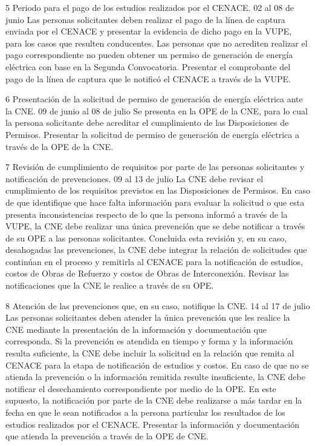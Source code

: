  5
 Periodo para el pago de los estudios realizados por el CENACE.
 02 al 08 de junio
 Las personas solicitantes deben realizar el pago de la línea de captura enviada por el CENACE y presentar la evidencia de dicho pago en la VUPE, para los casos que resulten conducentes. Las personas que no acrediten realizar el pago correspondiente no pueden obtener un permiso de generación de energía eléctrica con base en la Segunda Convocatoria.
 Presentar el comprobante del pago de la línea de captura que le notificó el CENACE a través de la VUPE.
 
 6
 Presentación de la solicitud de permiso de generación de energía eléctrica ante la CNE.
 09 de junio al 08 de julio
 Se presenta en la OPE de la CNE, para lo cual la persona solicitante debe acreditar el cumplimiento de las Disposiciones de Permisos.
 Presentar la solicitud de permiso de generación de energía eléctrica a través de la OPE de la CNE.
 
 7
 Revisión de cumplimiento de requisitos por parte de las personas solicitantes y notificación de prevenciones.
 09 al 13 de julio
 La CNE debe revisar el cumplimiento de los requisitos previstos en las Disposiciones de Permisos. En caso de que identifique que hace falta información para evaluar la solicitud o que esta presenta inconsistencias respecto de lo que la persona informó a través de la VUPE, la CNE debe realizar una única prevención que se debe notificar a través de su OPE a las personas solicitantes. Concluida esta revisión y, en su caso, desahogadas las prevenciones, la CNE debe integrar la relación de solicitudes que continúan en el proceso y remitirla al CENACE para la notificación de estudios, costos de Obras de Refuerzo y costos de Obras de Interconexión.
 Revisar las notificaciones que la CNE le realice a través de su OPE.
 
 8
 Atención de las prevenciones que, en su caso, notifique la CNE.
 14 al 17 de julio
 Las personas solicitantes deben atender la única prevención que les realice la CNE mediante la presentación de la información y documentación que corresponda. Si la prevención es atendida en tiempo y forma y la información resulta suficiente, la CNE debe incluir la solicitud en la relación que remita al CENACE para la etapa de notificación de estudios y costos. En caso de que no se atienda la prevención o la información remitida resulte insuficiente, la CNE debe notificar el desechamiento correspondiente por medio de la OPE. En este supuesto, la notificación por parte de la CNE debe realizarse a más tardar en la fecha en que le sean notificados a la persona particular los resultados de los estudios realizados por el CENACE.
 Presentar la información y documentación que atienda la prevención a través de la OPE de CNE.
 
